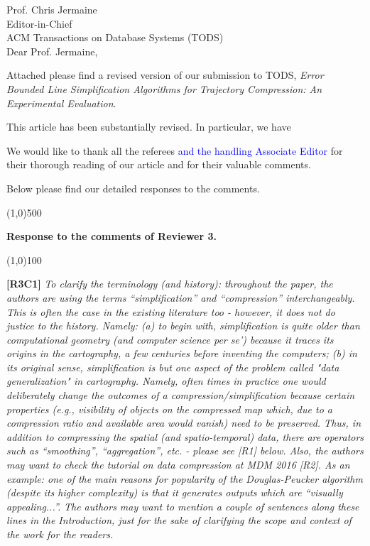 \documentclass{letter}
\begin{document}
Prof. {Chris Jermaine} \\
Editor-in-Chief		\\
ACM Transactions on Database Systems (TODS)	\\



Dear Prof. Jermaine,

Attached please find a revised version of our submission to TODS, \emph{Error Bounded Line Simplification Algorithms for Trajectory Compression: An Experimental Evaluation}.


 This article has been substantially revised. In particular, we have



We would like to thank all the referees \textcolor{blue}{and the handling Associate Editor} for their thorough reading of our article and for their valuable comments.

Below please find our detailed responses to the comments.





\line(1,0){500}

\textbf{Response to the comments of Reviewer 3.}

\line(1,0){100}

\textbf{[R3C1]} \emph{
To clarify the terminology (and history): throughout the paper, the authors are using the terms ``simplification'' and ``compression'' interchangeably. This is often the case in the existing literature too - however, it does not do justice to the history. Namely: (a) to begin with, simplification is quite older than computational geometry (and computer science per se') because it traces its origins in the cartography, a few centuries before inventing the computers; (b) in its original sense, simplification is but one aspect of the problem called "data generalization" in cartography. Namely, often times in practice one would deliberately change the outcomes of a compression/simplification because certain properties (e.g., visibility of objects on the compressed map which, due to a compression ratio and available area would vanish) need to be preserved. Thus, in addition to compressing the spatial (and spatio-temporal) data, there are operators such as ``smoothing'', ``aggregation'', etc. - please see [R1] below. Also, the authors may want to check the tutorial on data compression at MDM 2016 [R2]. As an example: one of the main reasons for popularity of the Douglas-Peucker algorithm (despite its higher complexity) is that it generates outputs which are ``visually appealing...''.}
%
\emph{The authors may want to mention a couple of sentences along these lines in the Introduction, just for the sake of clarifying the scope and context of the work for the readers.}
\end{document}
